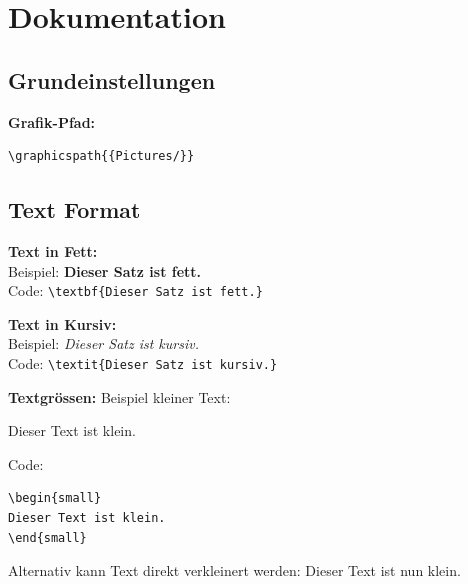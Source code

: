 
\pagebreak
\section{Dokumentation}


\subsection{Grundeinstellungen}

\textbf{Grafik-Pfad:}
\begin{verbatim}
\graphicspath{{Pictures/}}
\end{verbatim}



\subsection{Text Format}

\textbf{Text in Fett:}\\ Beispiel: \textbf{Dieser Satz ist fett.}\\ Code: \verb+\textbf{Dieser Satz ist fett.}+

\vspace{\baselineskip}

\textbf{Text in Kursiv:}\\ Beispiel: \textit{Dieser Satz ist kursiv.}\\ Code: \verb+\textit{Dieser Satz ist kursiv.}+

\vspace{\baselineskip}

\textbf{Textgrössen:}
Beispiel kleiner Text:
\begin{small}
Dieser Text ist klein.
\end{small}

Code:
\begin{verbatim}
\begin{small}
Dieser Text ist klein.
\end{small}
\end{verbatim}

Alternativ kann Text direkt verkleinert werden: \small{Dieser Text ist nun klein.} \normalsize{}

\vspace{\baselineskip}

